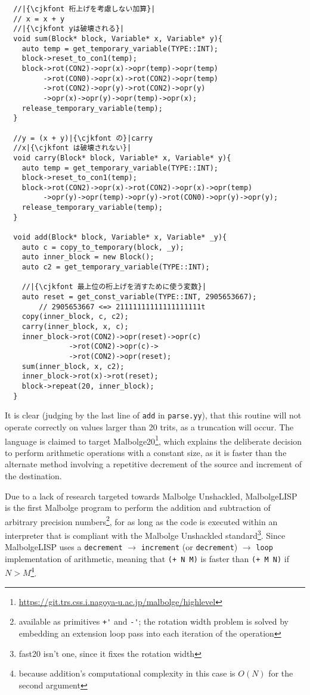 \begin{verbatim}
  //|{\cjkfont 桁上げを考慮しない加算}|
  // x = x + y
  //|{\cjkfont yは破壊される}|
  void sum(Block* block, Variable* x, Variable* y){
    auto temp = get_temporary_variable(TYPE::INT);
    block->reset_to_con1(temp);
    block->rot(CON2)->opr(x)->opr(temp)->opr(temp)
         ->rot(CON0)->opr(x)->rot(CON2)->opr(temp)
         ->rot(CON2)->opr(y)->rot(CON2)->opr(y)
         ->opr(x)->opr(y)->opr(temp)->opr(x);
    release_temporary_variable(temp);
  }

  //y = (x + y)|{\cjkfont の}|carry
  //x|{\cjkfont は破壊されない}|
  void carry(Block* block, Variable* x, Variable* y){
    auto temp = get_temporary_variable(TYPE::INT);
    block->reset_to_con1(temp);
    block->rot(CON2)->opr(x)->rot(CON2)->opr(x)->opr(temp)
         ->opr(y)->opr(temp)->opr(y)->rot(CON0)->opr(y)->opr(y);
    release_temporary_variable(temp);
  }
  
  void add(Block* block, Variable* x, Variable* _y){
    auto c = copy_to_temporary(block, _y);
    auto inner_block = new Block();
    auto c2 = get_temporary_variable(TYPE::INT);

    //|{\cjkfont 最上位の桁上げを消すために使う変数}|
    auto reset = get_const_variable(TYPE::INT, 2905653667);
        // 2905653667 <=> 21111111111111111111t
    copy(inner_block, c, c2);
    carry(inner_block, x, c);
    inner_block->rot(CON2)->opr(reset)->opr(c)
               ->rot(CON2)->opr(c)->
               ->rot(CON2)->opr(reset);
    sum(inner_block, x, c2);
    inner_block->rot(x)->rot(reset);
    block->repeat(20, inner_block);
  }
\end{verbatim}

\par It is clear (judging by the last line of \verb|add| in \verb|parse.yy|), that this routine will not operate correctly on values larger than 20 trits, as a truncation will occur. The language is claimed to target Malbolge20\footnote{\url{https://git.trs.css.i.nagoya-u.ac.jp/malbolge/highlevel}}, which explains the deliberate decision to perform arithmetic operations with a constant size, as it is faster than the alternate method involving a repetitive decrement of the source and increment of the destination.

\par Due to a lack of research targeted towards Malbolge Unshackled, MalbolgeLISP is the first Malbolge program to perform the addition and subtraction of arbitrary precision numbers\footnote{available as primitives \verb|+'| and \verb|-'|; the rotation width problem is solved by embedding an extension loop pass into each iteration of the operation}, for as long as the code is executed within an interpreter that is compliant with the Malbolge Unshackled standard\footnote{fast20 isn't one, since it fixes the rotation width}. Since MalbolgeLISP uses a \verb|decrement| $\rightarrow$ \verb|increment| (or \verb|decrement|) $\rightarrow$ \verb|loop| implementation of arithmetic, meaning that \verb|(+ N M)| is faster than \verb|(+ M N)| if $N > M$\footnote{because addition's computational complexity in this case is $O(N)$ for the second argument}.

